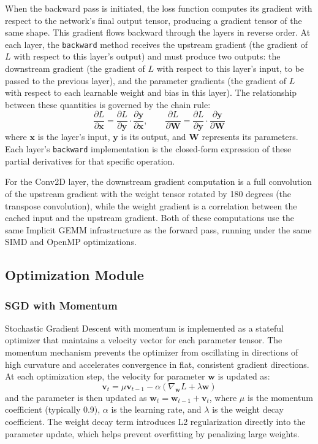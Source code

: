 \documentclass[12pt,oneside,a4paper]{report}
\begin{document}
When the backward pass is initiated, the loss function computes its gradient with respect to the network's final output tensor, producing a gradient tensor of the same shape. This gradient flows backward through the layers in reverse order. At each layer, the \texttt{backward} method receives the upstream gradient (the gradient of $L$ with respect to this layer's output) and must produce two outputs: the downstream gradient (the gradient of $L$ with respect to this layer's input, to be passed to the previous layer), and the parameter gradients (the gradient of $L$ with respect to each learnable weight and bias in this layer). The relationship between these quantities is governed by the chain rule:
$$\frac{\partial L}{\partial \mathbf{x}} = \frac{\partial L}{\partial \mathbf{y}} \cdot \frac{\partial \mathbf{y}}{\partial \mathbf{x}}, \qquad \frac{\partial L}{\partial \mathbf{W}} = \frac{\partial L}{\partial \mathbf{y}} \cdot \frac{\partial \mathbf{y}}{\partial \mathbf{W}}$$
where $\mathbf{x}$ is the layer's input, $\mathbf{y}$ is its output, and $\mathbf{W}$ represents its parameters. Each layer's \texttt{backward} implementation is the closed-form expression of these partial derivatives for that specific operation.

For the Conv2D layer, the downstream gradient computation is a full convolution of the upstream gradient with the weight tensor rotated by 180 degrees (the transpose convolution), while the weight gradient is a correlation between the cached input and the upstream gradient. Both of these computations use the same Implicit GEMM infrastructure as the forward pass, running under the same SIMD and OpenMP optimizations.

\subsection{Optimization Module}

\subsubsection{SGD with Momentum}

Stochastic Gradient Descent with momentum is implemented as a stateful optimizer that maintains a velocity vector for each parameter tensor. The momentum mechanism prevents the optimizer from oscillating in directions of high curvature and accelerates convergence in flat, consistent gradient directions. At each optimization step, the velocity for parameter $\mathbf{w}$ is updated as:
$$\mathbf{v}_t = \mu \mathbf{v}_{t-1} - \alpha \left( \nabla_{\mathbf{w}} L + \lambda \mathbf{w} \right)$$
and the parameter is then updated as $\mathbf{w}_t = \mathbf{w}_{t-1} + \mathbf{v}_t$, where $\mu$ is the momentum coefficient (typically 0.9), $\alpha$ is the learning rate, and $\lambda$ is the weight decay coefficient. The weight decay term introduces L2 regularization directly into the parameter update, which helps prevent overfitting by penalizing large weights.
\end{document}
